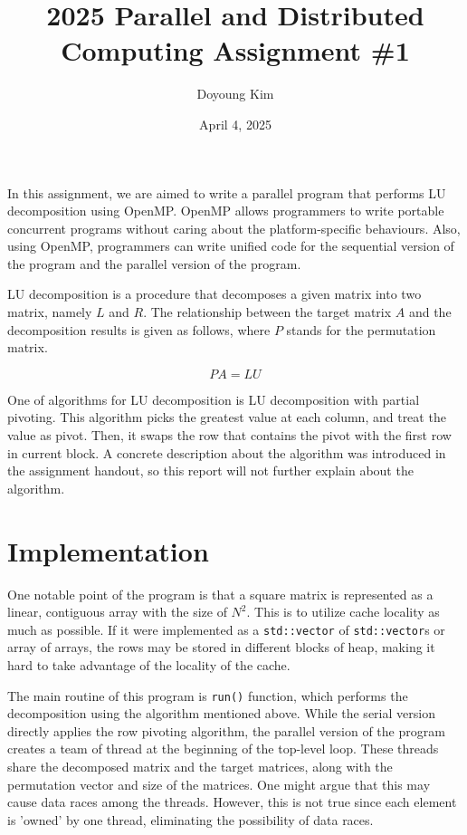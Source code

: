 \documentclass{article}
\title{\textbf{2025 Parallel and Distributed Computing Assignment \#1}}
\date{April 4, 2025}
\author{Doyoung Kim}
\begin{document}
\maketitle
In this assignment, we are aimed to write a parallel program that performs LU
decomposition using OpenMP. OpenMP allows programmers to write portable 
concurrent programs without caring about the platform-specific behaviours. Also,
using OpenMP, programmers can write unified code for the sequential version of
the program and the parallel version of the program. 

LU decomposition is a procedure that decomposes a given matrix into two matrix,
namely $L$ and $R$. The relationship between the target matrix $A$ and the
decomposition results is given as follows, where $P$ stands for the permutation
matrix.

$$PA=LU$$

One of algorithms for LU decomposition is LU decomposition with partial 
pivoting. This algorithm picks the greatest value at each column, and treat the
value as pivot. Then, it swaps the row that contains the pivot with the first
row in current block. A concrete description about the algorithm was introduced
in the assignment handout, so this report will not further explain about the
algorithm.

\section{Implementation}
One notable point of the program is that a square matrix is represented as a 
linear, contiguous array with the size of $N^2$. This is to utilize cache
locality as much as possible. If it were implemented as a \verb|std::vector| of 
\verb|std::vector|s or array of arrays, the rows may be stored in different
blocks of heap, making it hard to take advantage of the locality of the cache.

The main routine of this program is \verb|run()| function, which performs the
decomposition using the algorithm mentioned above. While the serial version 
directly applies the row pivoting algorithm, the parallel version of the program
creates a team of thread at the beginning of the top-level loop. These threads
share the decomposed matrix and the target matrices, along with the permutation
vector and size of the matrices. One might argue that this may cause data races
among the threads. However, this is not true since each element is 'owned' by
one thread, eliminating the possibility of data races.
\end{document}
